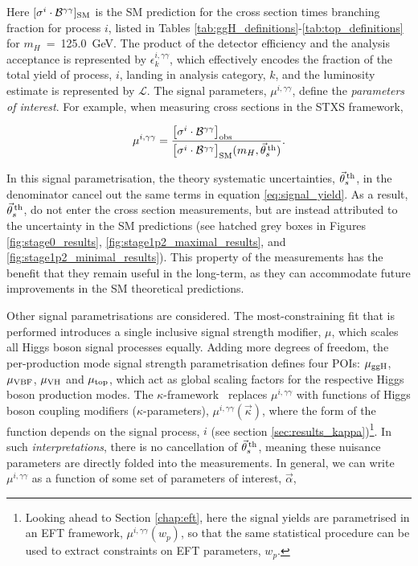 \noindent
Here $[\sigma^i \cdot \mathcal{B}^{\gamma\gamma}]_{\rm{SM}}$ is the SM prediction for the cross section times branching fraction for process $i$, listed in Tables \ref{tab:ggH_definitions}-\ref{tab:top_definitions} for $m_H$~=~125.0~GeV. The product of the detector efficiency and the analysis acceptance is represented by $\epsilon^{i,\gamma\gamma}_k$, which effectively encodes the fraction of the total yield of process, $i$, landing in analysis category, $k$, and the luminosity estimate is represented by $\mathcal{L}$. The signal parameters, $\mu^{i,\gamma\gamma}$, define the \textit{parameters of interest}. For example, when measuring cross sections in the STXS framework,

\begin{equation}\label{eq:mu_stxs}
    \mu^{i,\gamma\gamma} = \frac{\big[\sigma^i \cdot \mathcal{B}^{\gamma\gamma} \big]_{\rm{obs}}\hfill}{\big[\sigma^i \cdot \mathcal{B}^{\gamma\gamma} \big]_{\rm{SM}}(m_H,\vec{\theta}^{\,\rm{th}}_{s})}.
\end{equation}

\noindent
In this signal parametrisation, the theory systematic uncertainties, $\vec{\theta}^{\,\rm{th}}_{s}$, in the denominator cancel out the same terms in equation \ref{eq:signal_yield}. As a result, $\vec{\theta}^{\,\rm{th}}_{s}$, do not enter the cross section measurements, but are instead attributed to the uncertainty in the SM predictions (see hatched grey boxes in Figures \ref{fig:stage0_results}, \ref{fig:stage1p2_maximal_results}, and \ref{fig:stage1p2_minimal_results}). This property of the measurements has the benefit that they remain useful in the long-term, as they can accommodate future improvements in the SM theoretical predictions.

Other signal parametrisations are considered. The most-constraining fit that is performed introduces a single inclusive signal strength modifier, $\mu$, which scales all Higgs boson signal processes equally. Adding more degrees of freedom, the per-production mode signal strength parametrisation defines four POIs: $\mu_{\rm{ggH}}$, $\mu_{\rm{VBF}}$, $\mu_{\rm{VH}}$ and $\mu_{\rm{top}}$, which act as global scaling factors for the respective Higgs boson production modes. The $\kappa$-framework~\cite{Heinemeyer:2013tqa} replaces $\mu^{i,\gamma\gamma}$ with functions of Higgs boson coupling modifiers ($\kappa$-parameters), $\mu^{i,\gamma\gamma}(\vec{\kappa})$, where the form of the function depends on the signal process, $i$ (see section \ref{sec:results_kappa})\footnote{Looking ahead to Section \ref{chap:eft}, here the signal yields are parametrised in an EFT framework, $\mu^{i,\gamma\gamma}(w_p)$, so that the same statistical procedure can be used to extract constraints on EFT parameters, $w_p$.}. In such \textit{interpretations}, there is no cancellation of $\vec{\theta}^{\,\rm{th}}_{s}$, meaning these nuisance parameters are directly folded into the measurements. In general, we can write $\mu^{i,\gamma\gamma}$ as a function of some set of parameters of interest, $\vec{\alpha}$,

